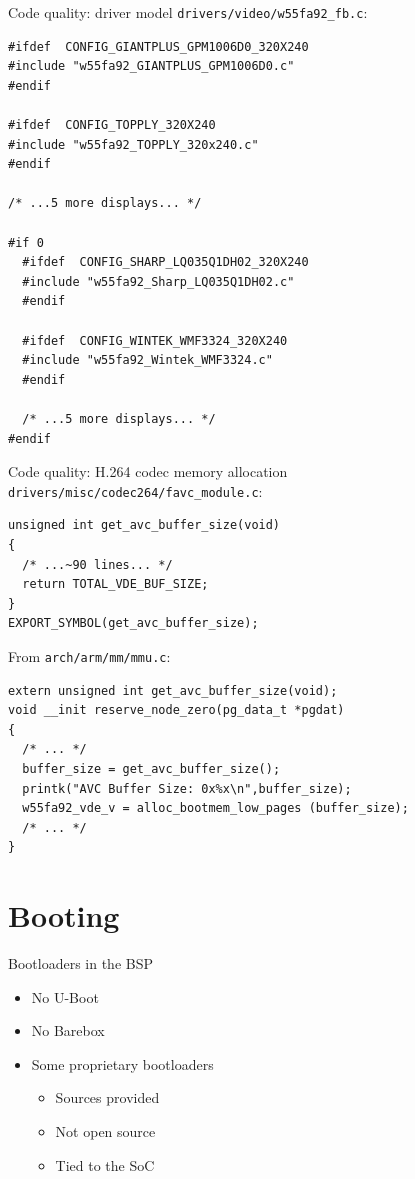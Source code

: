 \documentclass[xetex,table,aspectratio=169]{beamer}
\begin{document}
\begin{frame}[fragile]{Code quality: driver model}
  \texttt{drivers/video/w55fa92\_fb.c}:

  \linespread{0.9}
  \begin{verbatim}
#ifdef  CONFIG_GIANTPLUS_GPM1006D0_320X240
#include "w55fa92_GIANTPLUS_GPM1006D0.c"
#endif

#ifdef  CONFIG_TOPPLY_320X240
#include "w55fa92_TOPPLY_320x240.c"
#endif

/* ...5 more displays... */

#if 0
  #ifdef  CONFIG_SHARP_LQ035Q1DH02_320X240
  #include "w55fa92_Sharp_LQ035Q1DH02.c"
  #endif

  #ifdef  CONFIG_WINTEK_WMF3324_320X240
  #include "w55fa92_Wintek_WMF3324.c"
  #endif

  /* ...5 more displays... */
#endif
  \end{verbatim}
\end{frame}

\begin{frame}[fragile]{Code quality: H.264 codec memory allocation}
  \linespread{1}
  \texttt{drivers/misc/codec264/favc\_module.c}:

  \begin{verbatim}
unsigned int get_avc_buffer_size(void)
{
  /* ...~90 lines... */
  return TOTAL_VDE_BUF_SIZE;
}
EXPORT_SYMBOL(get_avc_buffer_size);
  \end{verbatim}

  From {\small\texttt{arch/arm/mm/mmu.c}}:
  \begin{verbatim}
extern unsigned int get_avc_buffer_size(void);
void __init reserve_node_zero(pg_data_t *pgdat)
{
  /* ... */
  buffer_size = get_avc_buffer_size();
  printk("AVC Buffer Size: 0x%x\n",buffer_size);
  w55fa92_vde_v = alloc_bootmem_low_pages (buffer_size);
  /* ... */
}
  \end{verbatim}
\end{frame}

\section{Booting}

\begin{frame}{Bootloaders in the BSP}
  \begin{itemize}
  \item No U-Boot
  \item No Barebox
  \item Some proprietary bootloaders
    \begin{itemize}
    \item Sources provided
    \item Not open source
    \item Tied to the SoC
    \end{itemize}
  \end{itemize}
\end{frame}
\end{document}
